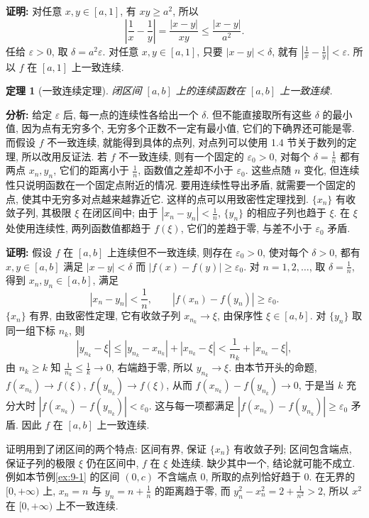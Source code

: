 \documentclass[UTF8,openany]{ctexbook}
\theoremstyle{chinesetextbook}
\newtheorem{theorem}{定理}[section]
\newenvironment{cnproof}{\par\indent\textbf{证明:} \ignorespaces}{\par}
\begin{document}
\begin{cnproof}
对任意 $x,y\in[a,1]$, 有 $xy\ge a^2$, 所以
\[
\left|\frac1x-\frac1y\right|=\frac{|x-y|}{xy}\le\frac{|x-y|}{a^2}.
\]
任给 $\varepsilon>0$, 取 $\delta=a^2\varepsilon$. 对任意 $x,y\in[a,1]$, 只要 $|x-y|<\delta$, 就有 $\displaystyle\left|\frac1x-\frac1y\right|<\varepsilon$. 所以 $f$ 在 $[a,1]$ 上一致连续.
\end{cnproof}
\begin{theorem}[一致连续定理]
闭区间 $[a,b]$ 上的连续函数在 $[a,b]$ 上一致连续.
\end{theorem}
\par\indent\textbf{分析:} 给定 $\varepsilon$ 后, 每一点的连续性各给出一个 $\delta$. 但不能直接取所有这些 $\delta$ 的最小值, 因为点有无穷多个, 无穷多个正数不一定有最小值, 它们的下确界还可能是零. 而假设 $f$ 不一致连续, 就能得到具体的点列, 对点列可以使用 1.4 节关于数列的定理, 所以改用反证法. 若 $f$ 不一致连续, 则有一个固定的 $\varepsilon_0>0$, 对每个 $\displaystyle\delta=\frac1n$ 都有两点 $x_n,y_n$, 它们的距离小于 $\displaystyle\frac1n$, 函数值之差却不小于 $\varepsilon_0$. 这些点随 $n$ 变化, 但连续性只说明函数在一个固定点附近的情况. 要用连续性导出矛盾, 就需要一个固定的点, 使其中无穷多对点越来越靠近它. 这样的点可以用致密性定理找到. $\{x_n\}$ 有收敛子列, 其极限 $\xi$ 在闭区间中; 由于 $\displaystyle|x_n-y_n|<\frac1n$, $\{y_n\}$ 的相应子列也趋于 $\xi$. 在 $\xi$ 处使用连续性, 两列函数值都趋于 $f(\xi)$, 它们的差趋于零, 与差不小于 $\varepsilon_0$ 矛盾.
\begin{cnproof}
假设 $f$ 在 $[a,b]$ 上连续但不一致连续, 则存在 $\varepsilon_0>0$, 使对每个 $\delta>0$, 都有 $x,y\in[a,b]$ 满足 $|x-y|<\delta$ 而 $|f(x)-f(y)|\ge\varepsilon_0$. 对 $n=1,2,\ldots$, 取 $\displaystyle\delta=\frac1n$, 得到 $x_n,y_n\in[a,b]$, 满足
\[
|x_n-y_n|<\frac1n,\qquad|f(x_n)-f(y_n)|\ge\varepsilon_0.
\]
$\{x_n\}$ 有界, 由致密性定理, 它有收敛子列 $x_{n_k}\to\xi$, 由保序性 $\xi\in[a,b]$. 对 $\{y_n\}$ 取同一组下标 $n_k$, 则
\[
|y_{n_k}-\xi|\le|y_{n_k}-x_{n_k}|+|x_{n_k}-\xi|<\frac1{n_k}+|x_{n_k}-\xi|,
\]
由 $n_k\ge k$ 知 $\displaystyle\frac1{n_k}\le\frac1k\to0$, 右端趋于零, 所以 $y_{n_k}\to\xi$. 由本节开头的命题, $f(x_{n_k})\to f(\xi)$, $f(y_{n_k})\to f(\xi)$, 从而 $f(x_{n_k})-f(y_{n_k})\to0$, 于是当 $k$ 充分大时 $|f(x_{n_k})-f(y_{n_k})|<\varepsilon_0$. 这与每一项都满足 $|f(x_{n_k})-f(y_{n_k})|\ge\varepsilon_0$ 矛盾. 因此 $f$ 在 $[a,b]$ 上一致连续.
\end{cnproof}
证明用到了闭区间的两个特点: 区间有界, 保证 $\{x_n\}$ 有收敛子列; 区间包含端点, 保证子列的极限 $\xi$ 仍在区间中, $f$ 在 $\xi$ 处连续. 缺少其中一个, 结论就可能不成立. 例如本节例\ref{ex:9-1} 的区间 $(0,c)$ 不含端点 $0$, 所取的点列恰好趋于 $0$. 在无界的 $[0,+\infty)$ 上, $x_n=n$ 与 $\displaystyle y_n=n+\frac1n$ 的距离趋于零, 而 $\displaystyle y_n^2-x_n^2=2+\frac1{n^2}>2$, 所以 $x^2$ 在 $[0,+\infty)$ 上不一致连续.
\end{document}
